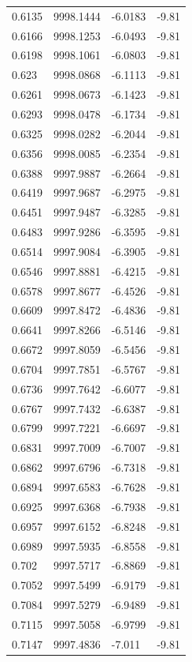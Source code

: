 \begin{table}[H]
\begin{tabular}{llll}
0.6135 & 9998.1444 & -6.0183 & -9.81 \\
0.6166 & 9998.1253 & -6.0493 & -9.81 \\
0.6198 & 9998.1061 & -6.0803 & -9.81 \\
0.623 & 9998.0868 & -6.1113 & -9.81 \\
0.6261 & 9998.0673 & -6.1423 & -9.81 \\
0.6293 & 9998.0478 & -6.1734 & -9.81 \\
0.6325 & 9998.0282 & -6.2044 & -9.81 \\
0.6356 & 9998.0085 & -6.2354 & -9.81 \\
0.6388 & 9997.9887 & -6.2664 & -9.81 \\
0.6419 & 9997.9687 & -6.2975 & -9.81 \\
0.6451 & 9997.9487 & -6.3285 & -9.81 \\
0.6483 & 9997.9286 & -6.3595 & -9.81 \\
0.6514 & 9997.9084 & -6.3905 & -9.81 \\
0.6546 & 9997.8881 & -6.4215 & -9.81 \\
0.6578 & 9997.8677 & -6.4526 & -9.81 \\
0.6609 & 9997.8472 & -6.4836 & -9.81 \\
0.6641 & 9997.8266 & -6.5146 & -9.81 \\
0.6672 & 9997.8059 & -6.5456 & -9.81 \\
0.6704 & 9997.7851 & -6.5767 & -9.81 \\
0.6736 & 9997.7642 & -6.6077 & -9.81 \\
0.6767 & 9997.7432 & -6.6387 & -9.81 \\
0.6799 & 9997.7221 & -6.6697 & -9.81 \\
0.6831 & 9997.7009 & -6.7007 & -9.81 \\
0.6862 & 9997.6796 & -6.7318 & -9.81 \\
0.6894 & 9997.6583 & -6.7628 & -9.81 \\
0.6925 & 9997.6368 & -6.7938 & -9.81 \\
0.6957 & 9997.6152 & -6.8248 & -9.81 \\
0.6989 & 9997.5935 & -6.8558 & -9.81 \\
0.702 & 9997.5717 & -6.8869 & -9.81 \\
0.7052 & 9997.5499 & -6.9179 & -9.81 \\
0.7084 & 9997.5279 & -6.9489 & -9.81 \\
0.7115 & 9997.5058 & -6.9799 & -9.81 \\
0.7147 & 9997.4836 & -7.011 & -9.81 \\

\end{tabular}
\end{table}
